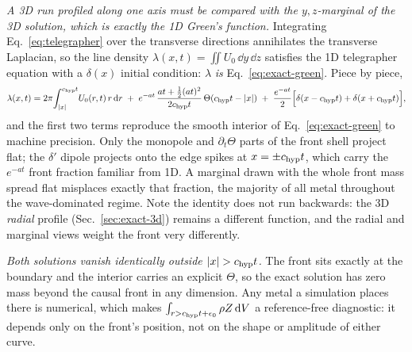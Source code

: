\documentclass[11pt, a4paper, parskip]{scrartcl}
\theoremstyle{plain}
\theoremstyle{definition}
\theoremstyle{remark}
\newcommand{\Zfrac}{Z}                                  %
\newcommand{\rhoZ}{\rho \Zfrac}                          %
\newcommand{\chyp}{c_{\rm hyp}}                           %
\begin{document}
\emph{A 3D run profiled along one axis must be compared with the
$y,z$-marginal of the 3D solution, which is exactly the 1D Green's
function.} Integrating Eq.~\eqref{eq:telegrapher} over the transverse
directions annihilates the transverse Laplacian, so the line density
$\lambda(x,t)=\iint U_0\,\dd y\,\dd z$ satisfies the 1D telegrapher
equation with a $\delta(x)$ initial condition: $\lambda$ \emph{is}
Eq.~\eqref{eq:exact-green}. Piece by piece,
\begin{equation}
  \label{eq:marginal-3d}
  \lambda(x,t) = 2\pi\!\int_{|x|}^{\chyp t}\! U_0(r,t)\,r\,\dd r
  \;+\; e^{-at}\,\frac{at+\tfrac12(at)^2}{2\chyp t}\,\Theta(\chyp t-|x|)
  \;+\; \frac{e^{-at}}{2}\Big[\delta(x-\chyp t)+\delta(x+\chyp t)\Big] ,
\end{equation}
and the first two terms reproduce the smooth interior of
Eq.~\eqref{eq:exact-green} to machine precision. Only the monopole and
$\partial_t\Theta$ parts of the front shell project flat; the $\delta'$
dipole projects onto the edge spikes at $x=\pm\chyp t$, which carry the
$e^{-at}$ front fraction familiar from 1D. A marginal drawn with the
whole front mass spread flat misplaces exactly that fraction, the
majority of all metal throughout the wave-dominated regime.
Note the identity does not run backwards: the 3D \emph{radial} profile
(Sec.~\ref{sec:exact-3d}) remains a different function, and the radial
and marginal views weight the front very differently.

\emph{Both solutions vanish identically outside $|x|>\chyp t$.} The front
sits exactly at the boundary and the interior carries an explicit
$\Theta$, so the exact solution has zero mass beyond the causal front in
any dimension. Any metal a simulation places there is numerical, which
makes $\int_{r>\chyp t+\epsilon_0}\rhoZ\,\dd V$ a reference-free
diagnostic: it depends only on the front's position, not on the shape or
amplitude of either curve.
\end{document}
